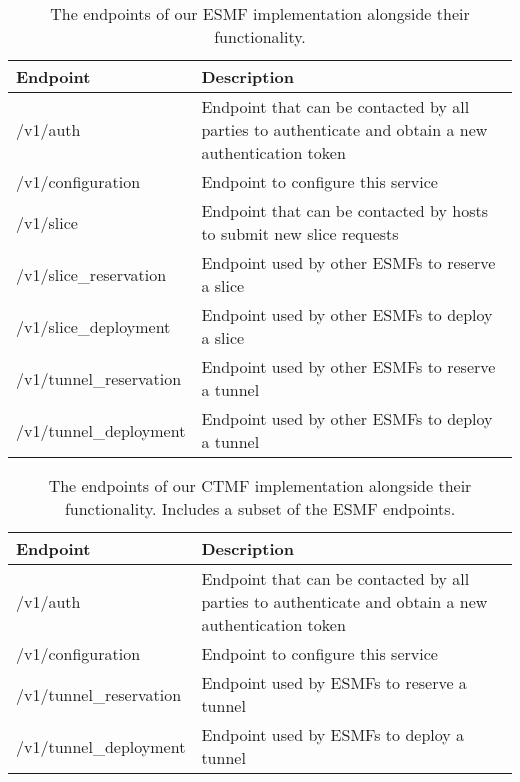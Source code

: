 \begin{table}[htp]
    \begin{tabularx}{\textwidth}{ |l|X| }
        \hline
        \textbf{Endpoint} & \textbf{Description} \\
        \hline
         /v1/auth & Endpoint that can be contacted by all parties to authenticate and obtain a new authentication token \\
         /v1/configuration & Endpoint to configure this service \\
        \hline
         /v1/slice & Endpoint that can be contacted by hosts to submit new slice requests \\
        \hline
         /v1/slice\_reservation & Endpoint used by other ESMFs to reserve a slice \\
         /v1/slice\_deployment & Endpoint used by other ESMFs to deploy a slice \\
         /v1/tunnel\_reservation & Endpoint used by other ESMFs to reserve a tunnel  \\
         /v1/tunnel\_deployment & Endpoint used by other ESMFs to deploy a tunnel \\
        \hline
    \end{tabularx}
    \caption{The endpoints of our ESMF implementation alongside their functionality.}
    \label{table:esmf}
\end{table}

\begin{table}[htp]
    \begin{tabularx}{\textwidth}{ |l|X| }
        \hline
        \textbf{Endpoint} & \textbf{Description} \\
        \hline
         /v1/auth & Endpoint that can be contacted by all parties to authenticate and obtain a new authentication token \\
         /v1/configuration & Endpoint to configure this service \\
        \hline
         /v1/tunnel\_reservation & Endpoint used by ESMFs to reserve a tunnel  \\
         /v1/tunnel\_deployment & Endpoint used by ESMFs to deploy a tunnel \\
        \hline
    \end{tabularx}
    \caption{The endpoints of our CTMF implementation alongside their functionality. Includes a subset of the ESMF endpoints.}
    \label{table:ctmf}
\end{table}

